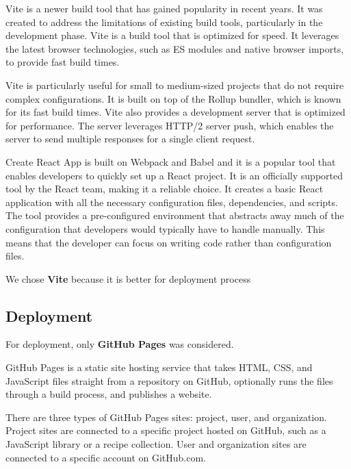   Vite is a newer build tool that has gained popularity in recent years. It was created to address the limitations of existing build tools, particularly in the development phase. Vite is a build tool that is optimized for speed. It leverages the latest browser technologies, such as ES modules and native browser imports, to provide fast build times.

  Vite is particularly useful for small to medium-sized projects that do not require complex configurations. It is built on top of the Rollup bundler, which is known for its fast build times. Vite also provides a development server that is optimized for performance. The server leverages HTTP/2 server push, which enables the server to send multiple responses for a single client request.

  Create React App is built on Webpack and Babel and it is a popular tool that enables developers to quickly set up a React project. It is an officially supported tool by the React team, making it a reliable choice. It creates a basic React application with all the necessary configuration files, dependencies, and scripts. The tool provides a pre-configured environment that abstracts away much of the configuration that developers would typically have to handle manually. This means that the developer can focus on writing code rather than configuration files.

  We chose \textbf{Vite} because it is better for deployment process


\subsection*{Deployment}
  For deployment, only \textbf{GitHub Pages} was considered.

  GitHub Pages is a static site hosting service that takes HTML, CSS, and JavaScript files straight from a repository on GitHub, optionally runs the files through a build process, and publishes a website.

  There are three types of GitHub Pages sites: project, user, and organization. Project sites are connected to a specific project hosted on GitHub, such as a JavaScript library or a recipe collection. User and organization sites are connected to a specific account on GitHub.com.

